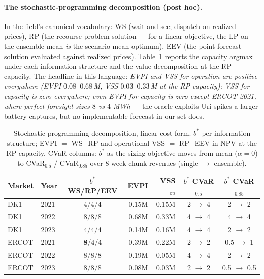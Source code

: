 \documentclass[11pt]{article}
\begin{document}
\paragraph{The stochastic-programming decomposition (post hoc).} In
the field's canonical vocabulary: WS (wait-and-see; dispatch on
realized prices), RP (the recourse-problem solution --- for a linear
objective, the LP on the ensemble mean \emph{is} the scenario-mean
optimum), EEV (the point-forecast solution evaluated against realized
prices). Table~\ref{tab:spdecomp} reports the capacity argmax under
each information structure and the value decomposition at the RP
capacity. The headline in this language: \emph{EVPI and VSS for
operation are positive everywhere (EVPI $0.08$--$0.68$\,M, VSS
$0.03$--$0.33$\,M at the RP capacity); VSS for capacity is zero
everywhere; even EVPI for capacity is zero except ERCOT 2021, where
perfect foresight sizes $8$ vs $4$ MWh} --- the oracle exploits Uri
spikes a larger battery captures, but no implementable forecast in our
set does.

\begin{table}[t]
\centering\small
\caption{\label{tab:spdecomp}Stochastic-programming decomposition,
linear cost form. $b^*$ per information structure; EVPI $=$ WS$-$RP and
operational VSS $=$ RP$-$EEV in NPV at the RP capacity. CVaR columns:
$b^*$ as the sizing objective moves from mean ($\alpha{=}0$) to
CVaR$_{0.5}$ / CVaR$_{0.85}$ over 8-week chunk revenues
(single $\to$ ensemble).}
\begin{tabular}{llcrrcc}
\toprule
Market & Year & $b^*$ WS/RP/EEV & EVPI & VSS$_{\mathrm{op}}$ &
$b^*$ CVaR$_{0.5}$ & $b^*$ CVaR$_{0.85}$ \\
\midrule
DK1 & 2021 & 4/4/4 & 0.15M & 0.15M & 2 $\to$ 4 & 2 $\to$ 2 \\
DK1 & 2022 & 8/8/8 & 0.68M & 0.33M & 4 $\to$ 4 & 4 $\to$ 4 \\
DK1 & 2023 & 4/4/4 & 0.14M & 0.16M & 4 $\to$ 4 & 2 $\to$ 2 \\
ERCOT & 2021 & \textbf{8}/4/4 & 0.39M & 0.22M & 2 $\to$ 2 & 0.5 $\to$ 1 \\
ERCOT & 2022 & 8/8/8 & 0.19M & 0.05M & 4 $\to$ 4 & 2 $\to$ 2 \\
ERCOT & 2023 & 8/8/8 & 0.08M & 0.03M & 2 $\to$ 2 & 0.5 $\to$ 0.5 \\
\bottomrule
\end{tabular}
\end{table}
\end{document}
